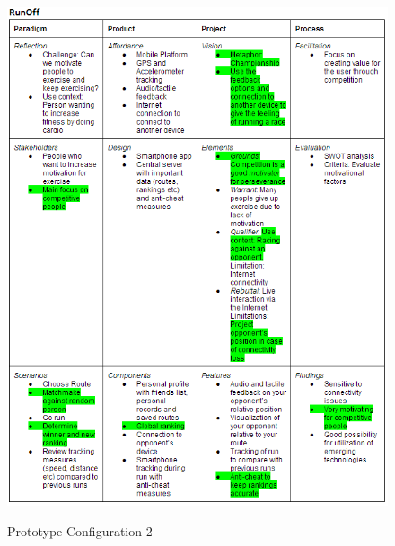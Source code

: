 \begin{figure}[ht!]
\begin{center}
 \label{fig:prototypeconfig2}
 \includegraphics[width=\textwidth]{img/prototypeconfig2.png}
 \caption{Prototype Configuration 2}
\end{center}
\end{figure}